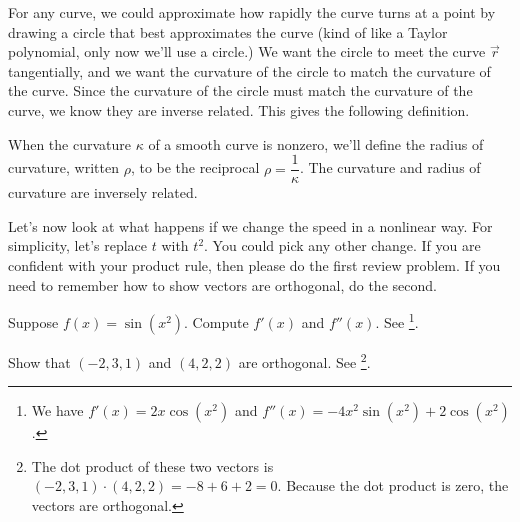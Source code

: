 For any curve, we could approximate how rapidly the curve turns at a point by drawing a circle that best approximates the curve (kind of like a Taylor polynomial, only now we'll use a circle.) We want the circle to meet the curve $\vec r$ tangentially, and we want the curvature of the circle to match the curvature of the curve. Since the curvature of the circle must match the curvature of the curve, we know they are inverse related.  This gives the following definition.

\begin{definition}%
When the curvature $\kappa$ of a smooth curve is nonzero, we'll define the radius of curvature, written $\rho$, to be the reciprocal $\rho = \dfrac{1}{\kappa}$. The curvature and radius of curvature are inversely related. 
\end{definition}



Let's now look at what happens if we change the speed in a nonlinear way.  For simplicity, let's replace $t$ with $t^2$.  You could pick any other change. If you are confident with your product rule, then please do the first review problem. If you need to remember how to show vectors are orthogonal, do the second.

\begin{review*}
 Suppose $f(x) = \sin(x^2)$.  Compute $f'(x)$ and $f''(x)$.  See 
\footnote{
We have $f'(x) = 2x\cos(x^2)$ and $f''(x) = -4x^2\sin(x^2)+2\cos(x^2)$.
}.
\end{review*}
\begin{review*}
 Show that $(-2,3,1)$ and $(4,2,2)$ are orthogonal. See 
\footnote{The dot product of these two vectors is 
$(-2,3,1)\cdot(4,2,2) = -8+6+2=0$. Because the dot product is zero, the vectors are orthogonal.
}.
\end{review*}



